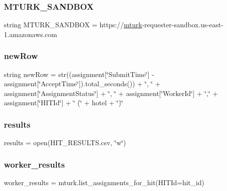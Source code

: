 \subsubsection{\texorpdfstring{M\+T\+U\+R\+K\+\_\+\+S\+A\+N\+D\+B\+OX}{MTURK\_SANDBOX}}
{\footnotesize\ttfamily string M\+T\+U\+R\+K\+\_\+\+S\+A\+N\+D\+B\+OX = \textquotesingle{}https\+://\hyperlink{namespaceget__results_a5d236ec2d0fb7be80dec953c4f7564d7}{mturk}-\/requester-\/sandbox.\+us-\/east-\/1.amazonaws.\+com\textquotesingle{}}

\mbox{\label{namespaceget__results_a7aa3be069dfb467ab7266a010a7ed8af}} 
\subsubsection{\texorpdfstring{new\+Row}{newRow}}
{\footnotesize\ttfamily string new\+Row = str((assignment\mbox{[}\char`\"{}Submit\+Time\char`\"{}\mbox{]} -\/ assignment\mbox{[}\char`\"{}Accept\+Time\char`\"{}\mbox{]}).total\+\_\+seconds()) + \char`\"{}, \char`\"{} + assignment\mbox{[}\char`\"{}Assignment\+Status\char`\"{}\mbox{]} + \char`\"{}, \char`\"{} + assignment\mbox{[}\char`\"{}Worker\+Id\char`\"{}\mbox{]} + \char`\"{},\char`\"{} + assignment\mbox{[}\char`\"{}H\+I\+T\+Id\char`\"{}\mbox{]} + \char`\"{} (\char`\"{} + hotel + \char`\"{})\char`\"{}}

\mbox{\label{namespaceget__results_a339bb5524b06e496a6aaa0a97a4a8d21}} 
\subsubsection{\texorpdfstring{results}{results}}
{\footnotesize\ttfamily results = open(\textquotesingle{}H\+I\+T\+\_\+\+R\+E\+S\+U\+L\+T\+S.\+csv\textquotesingle{}, \char`\"{}w\char`\"{})}

\mbox{\label{namespaceget__results_adecf8258a14164dab061b9f9f19f7eea}} 
\subsubsection{\texorpdfstring{worker\+\_\+results}{worker\_results}}
{\footnotesize\ttfamily worker\+\_\+results = mturk.\+list\+\_\+assignments\+\_\+for\+\_\+hit(H\+I\+T\+Id=hit\+\_\+id)}

